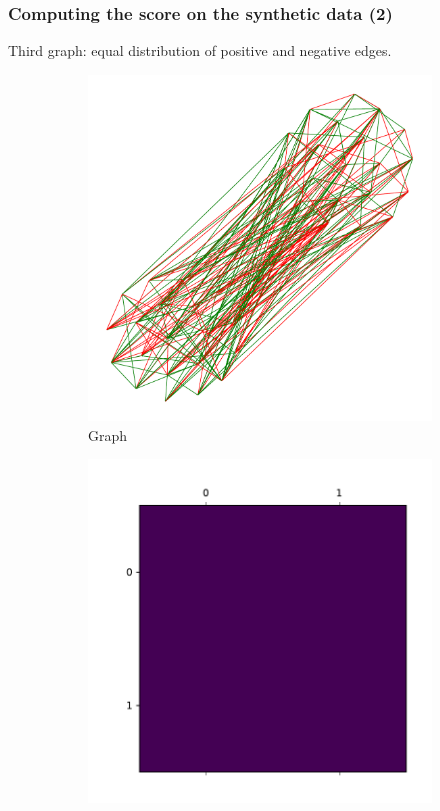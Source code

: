\documentclass{beamer}
\begin{document}
\begin{frame}[c]
	\frametitle{Computing the score on the synthetic data (2)}
	Third graph: equal distribution of positive and negative edges.

	\begin{figure}
		\begin{center}
			\begin{subfigure}[b]{0.3\textwidth}
				\centering
				\includegraphics[width=\textwidth]{out/synthetic/graph3.pdf}
				\caption{Graph}
				\label{fig:}
			\end{subfigure}
			\begin{subfigure}[b]{0.3\textwidth}
				\centering
				\includegraphics[width=\textwidth]{out/synthetic/omega_positive3.pdf}

\end{subfigure}
\end{center}
\end{figure}
\end{frame}
\end{document}
